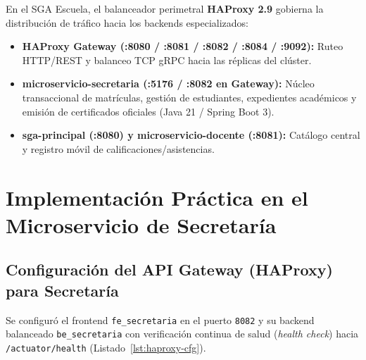 \documentclass[11pt,a4paper]{article}
\begin{document}
En el SGA Escuela, el balanceador perimetral \textbf{HAProxy 2.9} gobierna la distribuci\'on de tr\'afico hacia los backends especializados:
\begin{itemize}[noitemsep]
  \item \textbf{HAProxy Gateway (:8080 / :8081 / :8082 / :8084 / :9092):} Ruteo HTTP/REST y balanceo TCP gRPC hacia las réplicas del cl\'uster.
  \item \textbf{microservicio-secretaria (:5176 / :8082 en Gateway):} N\'ucleo transaccional de matr\'iculas, gesti\'on de estudiantes, expedientes acad\'emicos y emisi\'on de certificados oficiales (Java 21 / Spring Boot 3).
  \item \textbf{sga-principal (:8080) y microservicio-docente (:8081):} Cat\'alogo central y registro m\'ovil de calificaciones/asistencias.
\end{itemize}

\section{Implementaci\'on Pr\'actica en el Microservicio de Secretar\'ia}

\subsection{Configuraci\'on del API Gateway (HAProxy) para Secretar\'ia}
Se configur\'o el frontend \texttt{fe\_secretaria} en el puerto \texttt{8082} y su backend balanceado \texttt{be\_secretaria} con verificaci\'on continua de salud (\emph{health check}) hacia \texttt{/actuator/health} (Listado~\ref{lst:haproxy-cfg}).
\end{document}
